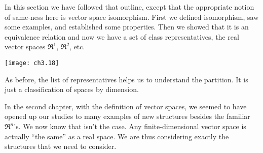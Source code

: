 In this section we have followed that outline, 
except that the appropriate notion of same-ness 
here is vector space isomorphism.
First we defined isomorphism, saw some examples,
and established some properties.
Then we showed that it is an equivalence relation and 
now we have a set of class representatives, 
the real vector spaces $\Re^1$, $\Re^2$, etc.
\begin{center}
  \texttt{[image: ch3.18]}
\end{center}
As before, the list of representatives helps us to understand the partition.
It is just a classification of spaces by dimension.

In the second chapter,
with the definition of vector spaces, we seemed to have opened up our studies
to many examples of new structures besides the familiar $\Re^n$'s.
We now know that isn't the case.
Any finite-dimensional vector space is actually
``the same'' as a real space.
We are thus considering exactly the structures that we need to consider.





